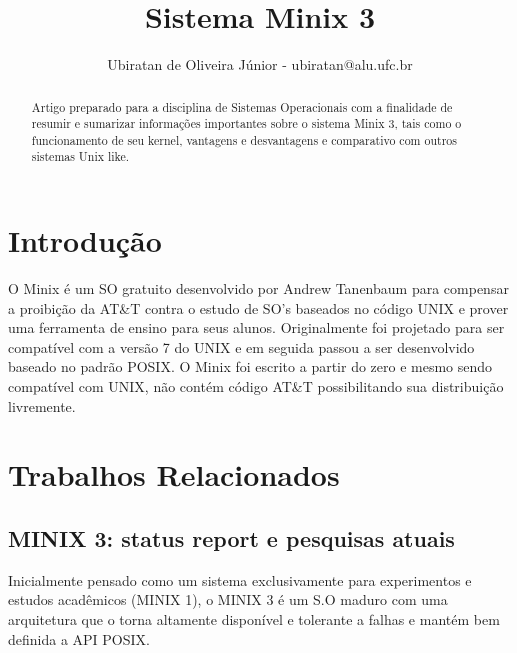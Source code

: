 \documentclass[runningheads]{llncs}
\begin{document}
%
\title{Sistema Minix 3}
%
%
\author{Ubiratan de Oliveira Júnior - ubiratan@alu.ufc.br}
%
\authorrunning{}
%
%
\maketitle              %
%
\begin{abstract}
Artigo preparado para a disciplina de Sistemas Operacionais com a finalidade de resumir e sumarizar informações importantes sobre o sistema Minix 3, tais como o funcionamento de seu kernel, vantagens e desvantagens e comparativo com outros sistemas Unix like.

\end{abstract}

\section{Introdução}    
O Minix é um SO gratuito desenvolvido por Andrew Tanenbaum para compensar a proibição da AT\&T  contra o estudo de SO's baseados no código UNIX e prover uma ferramenta de ensino para seus alunos. Originalmente foi projetado para ser compatível com a versão 7 do UNIX e em seguida passou a ser desenvolvido baseado no padrão POSIX. 
O Minix foi escrito a partir do zero e mesmo sendo compatível com UNIX, não contém código AT\&T possibilitando sua distribuição livremente.

\section{Trabalhos Relacionados}
\subsection{MINIX 3: status report e pesquisas atuais}Inicialmente pensado como um sistema exclusivamente para experimentos e estudos acadêmicos (MINIX 1), o MINIX 3 é um S.O maduro com uma arquitetura que o torna altamente disponível e tolerante a falhas e mantém bem definida a API POSIX. 
\end{document}
